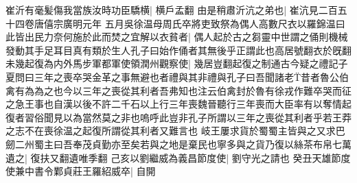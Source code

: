 崔沂有毫髪傷我當族汝時功臣驕横|{
	横戶孟翻}
由是稍肅沂沆之弟也|{
	崔沆見二百五十四卷唐僖宗廣明元年}
五月吳徐温母周氏卒將吏致祭為偶人高數尺衣以羅錦温曰此皆出民力奈何施於此而焚之宜解以衣貧者|{
	偶人起於古之芻靈中世謂之俑則機械發動其手足耳目真有類於生人孔子曰始作俑者其無後乎正謂此也高居號翻衣於旣翻}
未幾起復為内外馬步軍都軍使領潤州觀察使|{
	幾居豈翻起復之制通古今疑之禮記子夏問曰三年之喪卒哭金革之事無避也者禮與其非禮與孔子曰吾聞諸老昔者魯公伯禽有為為之也今以三年之喪從其利者吾弗知也注云伯禽封於魯有徐戎作難卒哭而征之急王事也自漢以後不許二千石以上行三年喪魏晉聽行三年喪而大臣率有以奪情起復者習俗聞見以為當然莫之非也嗚呼此豈非孔子所謂以三年之喪從其利者乎若王莽之志不在喪徐温之起復所謂從其利者又難言也}
岐王屢求貨於蜀蜀主皆與之又求巴劒二州蜀主曰吾奉茂貞勤亦至矣若與之地是棄民也寧多與之貨乃復以絲茶布帛七萬遺之|{
	復扶又翻遺唯季翻}
己亥以劉繼威為義昌節度使|{
	劉守光之請也}
癸丑天雄節度使兼中書令鄴貞莊王羅紹威卒|{
	自開}


